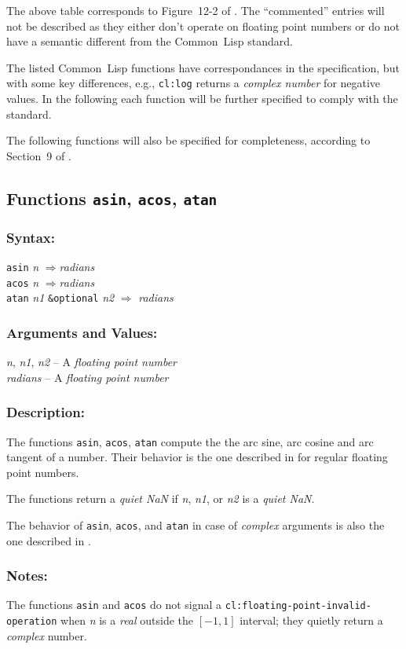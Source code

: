 \documentclass[10pt,fleqn]{article}
\newcommand{\CL}{\textsf{Common~Lisp}}
\newcommand{\code}[1]{\texttt{#1}}
\newcommand{\clieeeterm}[1]{\textit{#1}}
\newcommand{\varname}[1]{\textit{#1}}
\newcommand{\clterm}[1]{\textit{#1}}
\newcommand{\RArrow}{$\Rightarrow$}
\newcommand{\DDictionaryItem}[1]{\vspace*{6pt}\noindent\hrulefill\vspace*{-9pt}\subsection*{#1}}
\newcommand{\DSyntax}{\subsubsection*{Syntax:}}
\newcommand{\DArgsNValues}{\subsubsection*{Arguments and Values:}}
\newcommand{\DDescription}{\subsubsection*{Description:}}
\newcommand{\DNotes}{\subsubsection*{Notes:}}
\begin{document}
\vspace*{3mm}

\noindent
The above table corresponds to Figure~12-2 of \cite{1996:ANSIHyperSpec}.
The ``commented'' entries will not be described as they either don't
operate on floating point numbers or do not have a semantic different
from the \CL{} standard.

\noindent
The listed \CL{} functions have correspondances in the \cite{2008:IEEE-754}
specification, but with some key differences, e.g., \code{cl:log} returns
a \clterm{complex number} for negative values.  In the following each
function will be further specified to comply with the \cite{2008:IEEE-754}
standard.

\vspace*{3mm}

The following functions will also be specified for completeness,
according to Section~9 of \cite{2008:IEEE-754}.


\DDictionaryItem{Functions \code{asin}, \code{acos}, \code{atan}}

\DSyntax{}

\code{asin} \varname{n} \RArrow \varname{radians}\\
\code{acos} \varname{n} \RArrow \varname{radians}\\
\code{atan} \varname{n1} \code{\&optional} \varname{n2} \RArrow
\varname{radians}

\DArgsNValues{}

\varname{n}, \varname{n1}, \varname{n2} -- A \clieeeterm{floating
  point number}\\
\varname{radians} -- A \clieeeterm{floating point number}

\DDescription{}

The functions \code{asin}, \code{acos}, \code{atan} compute the the
arc sine, arc cosine and arc tangent of a number.  Their behavior is
the one described in \cite{1996:ANSIHyperSpec} for regular floating point
numbers.

The functions return a \clieeeterm{quiet NaN} if \varname{n},
\varname{n1}, or \varname{n2} is a \clieeeterm{quiet NaN}.

The behavior of \code{asin}, \code{acos}, and \code{atan} in case of
\clterm{complex} arguments is also the one described in
\cite{1996:ANSIHyperSpec}.

\DNotes{}

The functions \code{asin} and \code{acos} do not signal a
\code{cl:floating-point-invalid-operation} when \varname{n} is a
\clterm{real} outside the $[-1, 1]$ interval; they quietly return a
\clterm{complex} number.
\end{document}
